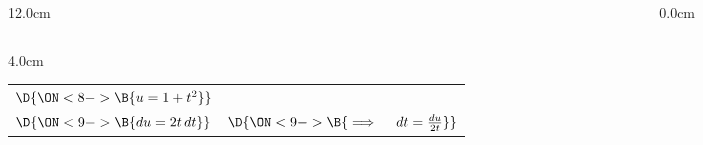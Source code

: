 \begin{frame}
\begin{columns}
\begin{column}{12.0cm}
\begin{columns}
\begin{column}{4.0cm}
\setlength{\extrarowheight}{0.2cm}
\begin{tabular}{ p{1.4cm} p{1.8cm} }
	$\D{\ON<8->{\B{u = 1+t^2}}}$ &  \\
	$\D{\ON<9->{\B{du = 2t \, dt}}}$ & $\D{\ON<9->{\B{\implies \quad dt = \frac{du}{2t}}}}$\\
\end{tabular}
\end{column}
\end{columns}

\end{column}
\begin{column}{0.0cm}\end{column}
\end{columns}
\end{frame}

